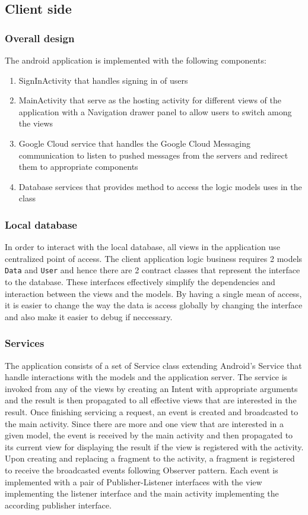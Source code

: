 \subsection{Client side}

\subsubsection{Overall design}
The android application is implemented with the following components:
\begin{enumerate}
    \item SignInActivity that handles signing in of users
    \item MainActivity that serve as the hosting activity for different views of the application with a Navigation
        drawer panel to allow users to switch among the views
    \item Google Cloud service that handles the Google Cloud Messaging communication to listen to pushed messages from
        the servers and redirect them to appropriate components
    \item Database services that provides method to access the logic models uses in the class
\end{enumerate}


\subsubsection{Local database}
In order to interact with the local database, all views in the application use centralized point of access. The client application logic
business requires 2 models \texttt{Data} and \texttt{User} and hence there are 2 contract classes that represent the interface to the
database. These interfaces effectively simplify the dependencies and interaction between the views and the models. By having a single mean
of access, it is easier to change the way the data is access globally by changing the interface and also make it easier to debug if
neccessary.

\subsubsection{Services}
The application consists of a set of Service class extending Android's Service that handle interactions with the models and the application
server. The service is invoked from any of the views by creating an Intent with appropriate arguments and the result is then propagated to
all effective views that are interested in the result. Once finishing servicing a request, an event is created and broadcasted to the main
activity. Since there are more and one view that are interested in a given model, the event is received by the main activity and then
propagated to its current view for displaying the result if the view is registered with the activity. Upon creating and replacing a fragment
to the activity, a fragment is registered to receive the broadcasted events following Observer pattern. Each event is implemented with a
pair of Publisher-Listener interfaces with the view implementing the listener interface and the main activity implementing the according
publisher interface.

